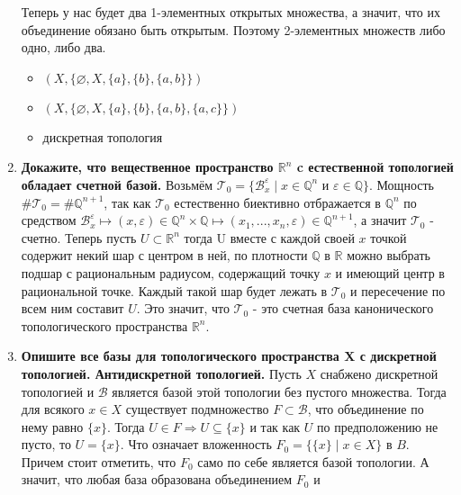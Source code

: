 \documentclass{article}
\begin{document}
\begin{enumerate}
        Теперь у нас будет два 1-элементных открытых множества, а значит, что
        их объединение обязано быть открытым. Поэтому 2-элементных множеств
        либо одно, либо два.
        \begin{itemize}
            \item $(X, \{\varnothing, X, \{a\}, \{b\}, \{a, b\}\})$
            \item $(X, \{\varnothing, X, \{a\}, \{b\}, \{a, b\}, \{a, c\}\})$
        \end{itemize}
        \begin{itemize}
            \item дискретная топология
        \end{itemize}

    \item \textbf{Докажите, что вещественное пространство $\mathbb{R}^n$ c
        естественной топологией обладает счетной базой.} Возьмём $\mathcal{T}_0
        =\{\mathcal{B}_x^\varepsilon\;|\;x\in\mathbb{Q}^n\text{ и }\varepsilon
        \in\mathbb{Q}\}$. Мощность $\#\mathcal{T}_0 = \#\mathbb{Q}^{n+1}$, так
        как $\mathcal{T}_0$ естественно биективно отбражается в $\mathbb{Q}^n$ по
        средством $\mathcal{B}_x^\varepsilon\mapsto(x,\varepsilon)\in\mathbb{Q}
        ^n\times\mathbb{Q}\mapsto(x_1, ..., x_n, \varepsilon)\in\mathbb{Q}^{n+1}$,
        а значит $\mathcal{T}_0$ - счетно. Теперь пусть $U\subset\mathbb{R}^n$
        тогда U вместе с каждой своей $x$ точкой содержит некий шар с центром в
        ней, по плотности $\mathbb{Q}$ в $\mathbb{R}$ можно выбрать подшар с
        рациональным радиусом, содержащий точку $x$ и имеющий центр в
        рациональной точке. Каждый такой шар будет лежать в $\mathcal{T}_0$ и
        пересечение по всем ним составит $U$. Это значит, что $\mathcal{T}_0$ -
        это счетная база канонического топологического пространства
        $\mathbb{R}^n$.
    \item \textbf{Опишите все базы для топологического пространства X с
        дискретной топологией. Антидискретной топологией.} Пусть $X$ снабжено
        дискретной топологией и $\mathcal{B}$ является базой этой топологии без
        пустого множества. Тогда для всякого $x\in X$ существует подмножество
        $F\subset\mathcal{B}$, что объединение по нему равно $\{x\}$. Тогда
        $U\in F \Rightarrow U\subseteq\{x\}$ и так как $U$ по предположению не
        пусто, то $U = \{x\}$. Что означает вложенность $F_0=\{\{x\}\;|\;x\in X
        \}$ в $B$. Причем стоит отметить, что $F_0$ само по себе является базой
        топологии. А значит, что любая база образована объединением $F_0$ и

\end{enumerate}
\end{document}
